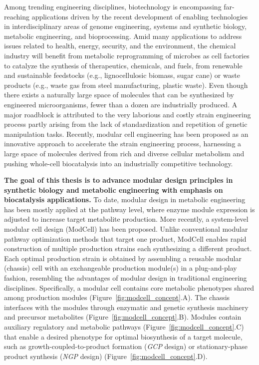 Among trending engineering disciplines, biotechnology is encompassing far-reaching applications driven by the recent development of enabling technologies in interdisciplinary areas of genome engineering,\citep{barrangou2016} systems and synthetic biology,\citep{kahl2013} metabolic engineering,\citep{nielsen2016,lee2019} and bioprocessing.\citep{cramer2011, olson2012} Amid many applications to address issues related to health, energy, security, and the environment, the chemical industry will benefit from metabolic reprogramming of microbes as cell factories to catalyze the synthesis of therapeutics, chemicals, and fuels, from renewable and sustainable feedstocks (e.g., lignocellulosic biomass, sugar cane) or waste products (e.g., waste gas from steel manufacturing, plastic waste).
Even though there exists a naturally large space of molecules that can be synthesized by engineered microorganisms, fewer than a dozen are industrially produced.\citep{nielsen2016} A major roadblock is attributed to the very laborious and costly strain engineering process partly arising from the lack of standardization and repetition of genetic manipulation tasks.\citep{king2017, winkler2015} Recently, modular cell engineering has been proposed as an innovative approach to accelerate the strain engineering process, harnessing a large space of molecules derived from rich and diverse cellular metabolism and pushing whole-cell biocatalysis into an industrially competitive technology.\citep{trinh2015, trinh2016}

\textbf{The goal of this thesis is to advance modular design principles in synthetic biology and metabolic engineering with emphasis on biocatalysis applications.}
To date, modular design in metabolic engineering has been mostly applied at the pathway level, where enzyme module expression is adjusted to increase target metabolite production.\citep{biggs2014, jeschek2017, lu2018, yadav2012} More recently, a system-level modular cell design (ModCell) has been proposed.\citep{trinh2015}
Unlike conventional modular pathway optimization methods that target one product, ModCell enables rapid construction of multiple production strains each synthesizing a different product.
Each optimal production strain is obtained by assembling a reusable modular (chassis) cell with an exchangeable production module(s) in a plug-and-play fashion, resembling the advantages of modular design in traditional engineering disciplines.
Specifically, a modular cell contains core metabolic phenotypes shared among production modules (Figure~\ref{fig:modcell_concept}.A).
The chassis interfaces with the modules through enzymatic and genetic synthesis machinery and precursor metabolites (Figure~\ref{fig:modcell_concept}.B).
Modules contain auxiliary regulatory and metabolic pathways (Figure~\ref{fig:modcell_concept}.C) that enable a desired phenotype for optimal biosynthesis of a target molecule, such as growth-coupled-to-product formation (\textit{GCP} design) or stationary-phase product synthesis (\textit{NGP} design) (Figure~\ref{fig:modcell_concept}.D).

